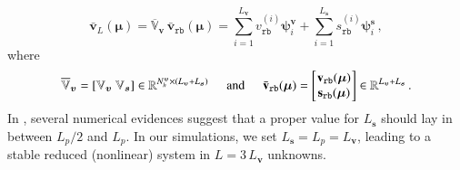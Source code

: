 \documentclass{elsarticle}
\numberwithin{equation}{section}
\theoremstyle{theorem}
\theoremstyle{definition}
\theoremstyle{remark}
\theoremstyle{proposition}
\numberwithin{figure}{section}
\newcommand{\bg}[1]{\boldsymbol{#1}}
\begin{document}
		\begin{equation*}
			\bar{\mathbf{v}}_L(\bg{\mu}) = \overline{\mathbb{V}}_{\bg{v}} \, \bar{\mathbf{v}}_{\texttt{rb}}(\bg{\mu}) = \sum_{i = 1}^{L_{\bg{v}}} v_{\texttt{rb}}^{(i)} \bg{\psi}_i^{\bg{v}} + \sum_{i = 1}^{L_{\bg{s}}} s_{\texttt{rb}}^{(i)} \bg{\psi}_i^{\bg{s}} \, ,
		\end{equation*} 
		where
		\begin{equation*}
			\overline{\mathbb{V}}_{\bg{v}} = \left[ \mathbb{V}_{\bg{v}} ~ \mathbb{V}_{\bg{s}} \right] \in \mathbb{R}^{N_h^{\bg{v}} \times (L_{\bg{v}} + L_{\bg{s}})} \hspace*{0.5cm} \text{and} \hspace*{0.5cm} \bar{\mathbf{v}}_{\texttt{rb}}(\bg{\mu}) =
			\begin{bmatrix}
			\hspace*{-0.15cm}
			\begin{array}{c}
				\mathbf{v}_{\texttt{rb}}(\bg{\mu}) \\
				\mathbf{s}_{\texttt{rb}}(\bg{\mu})
			\end{array} 
			\hspace*{-0.15cm}
			\end{bmatrix} 
			\in \mathbb{R}^{L_{\bg{v}} + L_{\bg{s}}} \, .
		\end{equation*}
		In \cite{Bal14}, several numerical evidences suggest that a proper value for $L_{\bg{s}}$ should lay in between $L_p / 2$ and $L_p$. In our simulations, we set $L_{\bg{s}} = L_p = L_{\bg{v}}$, leading to a stable reduced (nonlinear) system in $L = 3 \, L_{\bg{v}}$ unknowns.
		
\end{document}
